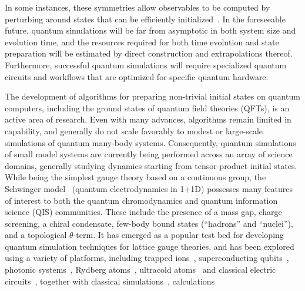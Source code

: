 \documentclass[aps, pra, onecolumn, tightenlines, letterpaper, amsmath, amssymb, preprintnumbers, floatfix, longbibliography, nofootinbib]{revtex4-2}
\begin{document}
In some instances, these symmetries
allow observables to be computed by perturbing around states that can be efficiently 
initialized~\cite{Klco:2021lap}.
In the foreseeable future, quantum simulations  will be far from asymptotic in both system size and evolution time, and the resources required for both time evolution and state preparation
will be estimated by direct construction and extrapolations thereof.
Furthermore, successful quantum simulations will require specialized quantum circuits and workflows that are optimized for specific quantum hardware.


The development of algorithms for preparing 
non-trivial initial states on quantum computers, including the ground states of quantum field theories (QFTs), is an active area of research.
Even with many advances, 
algorithms remain limited in capability, and generally do not scale favorably to modest or large-scale simulations of quantum many-body systems.
Consequently, quantum simulations of small model systems are currently 
being performed across an array of science domains,
generally studying dynamics starting from tensor-product initial states.
While being the simplest gauge theory based on a continuous group, 
the Schwinger model~\cite{Schwinger:1962tp} (quantum electrodynamics in 1+1D)  
possesses many features of interest to both the 
quantum chromodynamics and quantum information science (QIS)
communities.
These include
the presence of a mass gap, charge screening, a chiral condensate, few-body bound states (``hadrons'' and ``nuclei''), and  a topological $\theta$-term.
It has emerged as a popular test bed for developing quantum simulation techniques
for  lattice gauge theories,
and has been explored using a variety of platforms, including trapped ions~\cite{Martinez:2016yna,Kokail:2018eiw,Nguyen:2021hyk,Mueller:2022xbg}, superconducting qubits~\cite{Klco:2018kyo,Mazzola:2021hma,deJong:2021wsd,Gong:2021bcp,Mildenberger:2022jqr,Charles:2023zbl,Pomarico:2023png}, photonic systems~\cite{Lu:2018pjk}, Rydberg atoms~\cite{Surace:2019dtp}, ultracold atoms~\cite{Mil:2019pbt,Yang:2020yer,Zhou:2021kdl,PhysRevResearch.5.023010,zhang2023observation} and classical electric circuits~\cite{Riechert:2021ink}, together with classical simulations~\cite{Banerjee:2012pg,Marcos:2013aya,Yang:2016hjn,Muschik:2016tws,Davoudi:2019bhy,Luo:2019vmi,Chakraborty:2020uhf,Ferguson:2020qyf,Davoudi:2021ney,Yamamoto:2021vxp,Honda:2021aum,Bennewitz:2021jqi,Andrade:2021pil,Honda:2021ovk,Halimeh:2022pkw,Xie:2022jgj,Davoudi:2022uzo,Nagano:2023uaq,Popov:2023xft,Nagano:2023kge}, calculations~\cite{Hauke:2013jga,Kasper:2016mzj,Notarnicola:2019wzb,Tran:2020azk,Shen:2021zrg,Jensen:2022hyu,Florio:2023dke,Ikeda:2023zil} 
\end{document}
